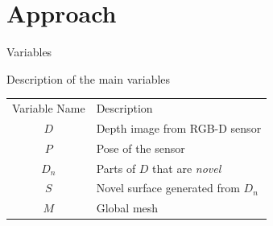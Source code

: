 \section{Approach}


\begin{frame}{Variables} %

Description of the main variables

  \begin{table}[h]
    \begin{center}
      \begin{tabular}{c|l}
      \cellcolor{white} Variable Name & Description \\ %
      \rowcolor{LightGray}
      $D$ & Depth image from RGB-D sensor \\
      $P$ & Pose of the sensor \\
      \rowcolor{LightGray}
      $D_n$ & Parts of $D$ that are \emph{novel} \\
      $S$ & Novel surface generated from $D_n$ \\
      \rowcolor{LightGray}
      $M$ & Global mesh \\
      \end{tabular}
    \end{center}
  \end{table}

\end{frame}



